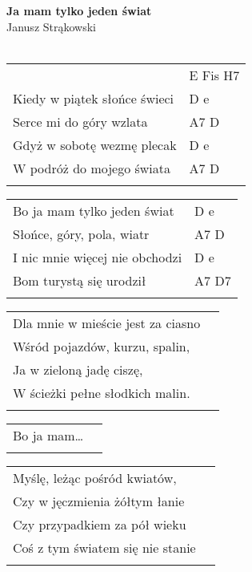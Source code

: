 \documentclass[a5paper]{article}
\begin{document}


\noindent
\fontsize{12pt}{15pt}\selectfont
\textbf{Ja mam tylko jeden świat} \\
\fontsize{8pt}{10pt}\selectfont
Janusz Strąkowski \\ \\
\fontsize{10pt}{12pt}\selectfont
{}
\begin{tabular}{@{}p{8.00cm}p{3cm}@{}}
\noindent
	& E Fis H7 \\
Kiedy w piątek słońce świeci & D e \\
Serce mi do góry wzlata & A7 D \\
Gdyż w sobotę wezmę plecak & D e \\
W podróż do mojego świata & A7 D \\ \\
\end{tabular}

\noindent
\begin{tabular}{@{}p{7.00cm}p{3cm}@{}}
Bo ja mam tylko jeden świat & D e \\
Słońce, góry, pola, wiatr & A7 D \\
I nic mnie więcej nie obchodzi & D e \\
Bom turystą się urodził & A7 D7 \\ \\
\end{tabular}

\noindent
\begin{tabular}{@{}p{7.00cm}p{3cm}@{}}
Dla mnie w mieście jest za ciasno \\
Wśród pojazdów, kurzu, spalin, \\
Ja w zieloną jadę ciszę, \\
W ścieżki pełne słodkich malin. \\ \\
\end{tabular}

\noindent
\begin{tabular}{@{}p{7.00cm}p{3cm}@{}}
Bo ja mam… \\ \\
\end{tabular}

\noindent
\begin{tabular}{@{}p{7.00cm}p{3cm}@{}}
Myślę, leżąc pośród kwiatów, \\
Czy w jęczmienia żółtym łanie \\
Czy przypadkiem za pół wieku \\
Coś z tym światem się nie stanie \\ \\
\end{tabular}
\end{document}
